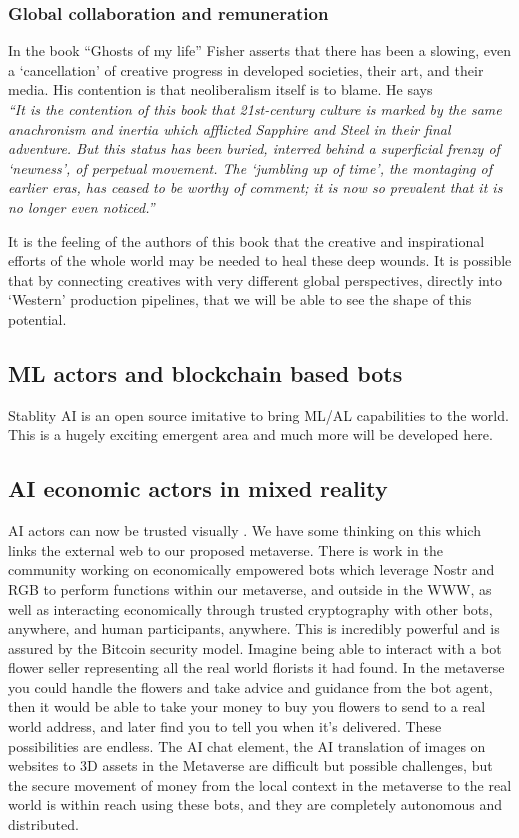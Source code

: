 \subsubsection{Global collaboration and remuneration}
In the book ``Ghosts of my life'' \cite{fisher2014ghosts} Fisher asserts that there has been a slowing, even a `cancellation' of creative progress in developed societies, their art, and their media. His contention is that neoliberalism itself is to blame. He says\\
\textit{``It is the contention of this book that 21st-century culture is marked by the same anachronism and inertia which afflicted Sapphire and Steel in their final adventure. But this status has been buried, interred behind a superficial frenzy of ‘newness’, of perpetual movement. The ‘jumbling up of time’, the montaging of earlier eras, has ceased to be worthy of comment; it is now so prevalent that it is no longer even noticed.''}

It is the feeling of the authors of this book that the creative and inspirational efforts of the whole world may be needed to heal these deep wounds. It is possible that by connecting creatives with very different global perspectives, directly into `Western' production pipelines, that we will be able to see the shape of this potential.
\subsection{ML actors and blockchain based bots}
Stablity AI is an open source imitative to bring ML/AL capabilities to the world. This is a hugely exciting emergent area and much more will be developed here.
\subsection{AI economic actors in mixed reality}
AI actors can now be trusted visually \cite{nightingale2022ai}. We have some thinking on this which links the external web to our proposed metaverse. There is work in the community working on economically empowered bots which leverage Nostr and RGB to perform functions within our metaverse, and outside in the WWW, as well as interacting economically through trusted cryptography with other bots, anywhere, and human participants, anywhere. This is incredibly powerful and is assured by the Bitcoin security model. Imagine being able to interact with a bot flower seller representing all the real world florists it had found. In the metaverse you could handle the flowers and take advice and guidance from the bot agent, then it would be able to take your money to buy you flowers to send to a real world address, and later find you to tell you when it's delivered. These possibilities are endless. The AI chat element, the AI translation of images on websites to 3D assets in the Metaverse are difficult but possible challenges, but the secure movement of money from the local context in the metaverse to the real world is within reach using these bots, and they are completely autonomous and distributed.
